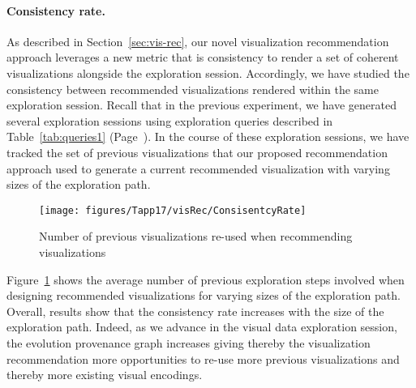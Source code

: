   \paragraph*{\textbf{Consistency rate.}}
  \label{par:cons-rate}
As described in Section~\ref{sec:vis-rec}, our novel visualization recommendation approach leverages a new metric that is consistency to render a set of coherent visualizations alongside the exploration session. 
Accordingly, we have studied the consistency between recommended visualizations rendered within the same exploration session.
Recall that in the previous experiment, we have generated several exploration sessions using exploration queries described in Table~\ref{tab:queries1} (Page~\pageref{tab:queries1}). 
In the course of these exploration sessions, we have tracked the set of previous visualizations that our proposed recommendation approach used to generate a current recommended visualization with varying sizes of the exploration path.



\begin{figure}[b]
\centering
\texttt{[image: figures/Tapp17/visRec/ConsisentcyRate]}
\caption{Number of previous visualizations re-used when recommending visualizations}
\label{fig:vis-consistency}
\end{figure}






Figure~\ref{fig:vis-consistency} shows the average number of previous exploration steps involved when designing recommended visualizations for varying sizes of the exploration path.
Overall, results show that the consistency rate increases with the size of the exploration path.
Indeed, as we advance in the visual data exploration session, the evolution provenance graph increases giving thereby the visualization recommendation more opportunities to re-use more previous visualizations and thereby more existing visual encodings.


